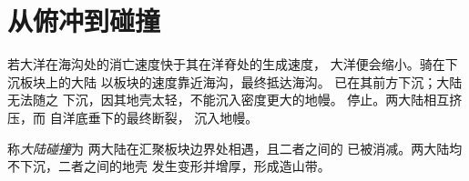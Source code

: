 \section{从俯冲到碰撞}

若大洋在海沟处的消亡速度快于其在洋脊处的生成速度，
大洋便会缩小。骑在下沉板块上的大陆
以板块的速度靠近海沟，最终抵达海沟。
已在其前方下沉；大陆无法随之
下沉，因其地壳太轻，不能沉入密度更大的地幔。
停止。两大陆相互挤压，而
自洋底垂下的最终断裂，
沉入地幔。

\begin{definition}[大陆碰撞]\label{def:g12:mountain-building:collision}
称\emph{大陆碰撞}为
两大陆在汇聚板块边界处相遇，且二者之间的
已被消减。两大陆均不下沉，二者之间的地壳
发生变形并增厚，形成造山带。
\end{definition}

